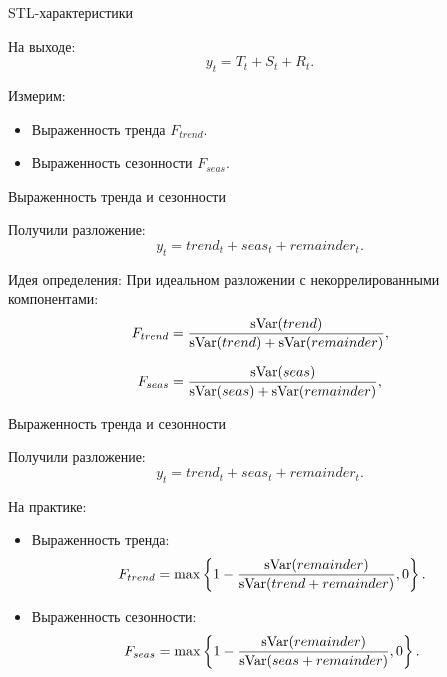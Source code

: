   \begin{frame}{STL-характеристики}

    \alert{На выходе:}
    \[
      y_t = T_t + S_t + R_t.
    \]

    \pause
    Измерим:
    \begin{itemize}
      \item Выраженность тренда $F_{trend}$.
      \item Выраженность сезонности $F_{seas}$.
    \end{itemize}

  \end{frame}

  \begin{frame}{Выраженность тренда и сезонности}

    Получили разложение:
    \[
      y_t = trend_t + seas_t + remainder_t.
    \]
    
    \pause
    \alert{Идея определения:}
    При идеальном разложении с некоррелированными компонентами:
    \[
      F_{trend} = \frac{\operatorname{sVar}(trend)}{\operatorname{sVar}(trend) + \operatorname{sVar}(remainder)},
    \]

    \pause
    \[
    F_{seas} = \frac{\operatorname{sVar}(seas)}{\operatorname{sVar}(seas) + \operatorname{sVar}(remainder)},
  \]
  \end{frame}

  \begin{frame}{Выраженность тренда и сезонности}

    Получили разложение:
    \[
      y_t = trend_t + seas_t + remainder_t.
    \]

    \pause
    \alert{На практике}:
    \begin{itemize}[<+->]
      \item Выраженность тренда:
      \[
        F_{trend} = \max\left\{1 - \frac{\operatorname{sVar}(remainder)}{\operatorname{sVar}(trend + remainder)}, 0 \right\}.
      \]
      \item Выраженность сезонности:
      \[
        F_{seas} = \max\left\{1 - \frac{\operatorname{sVar}(remainder)}{\operatorname{sVar}(seas + remainder)}, 0 \right\}.
      \]

    \end{itemize}



  \end{frame}


